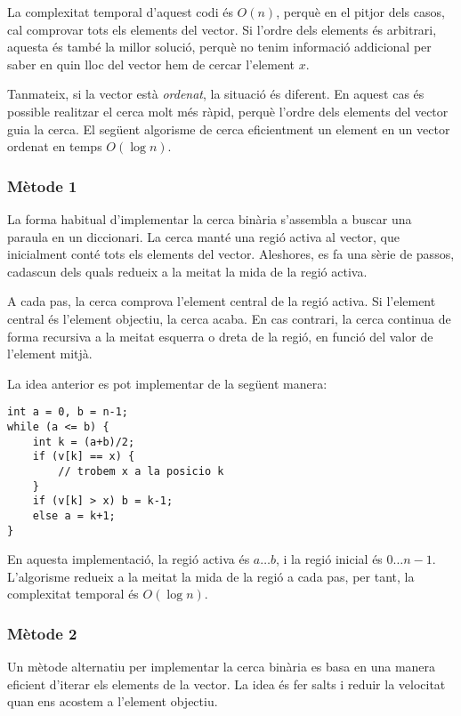 La complexitat temporal d'aquest codi és $O(n)$,
perquè en el pitjor dels casos, cal comprovar
tots els elements del vector.
Si l'ordre dels elements és arbitrari,
aquesta és també la millor solució, perquè
no tenim informació addicional per saber en quin
lloc del vector hem de cercar l'element $x$.

Tanmateix, si la vector està \emph{ordenat},
la situació és diferent.
En aquest cas és possible realitzar el
cerca molt més ràpid, perquè l'ordre dels
elements del vector guia la cerca.
El següent algorisme de 
cerca eficientment un element en un vector ordenat
en temps $O(\log n)$.

\subsubsection{Mètode 1}

La forma habitual d'implementar la cerca binària
s'assembla a buscar una paraula en un diccionari.
La cerca manté una regió activa al vector,
que inicialment conté tots els elements del vector.
Aleshores, es fa una sèrie de passos,
cadascun dels quals redueix a la meitat la mida de la regió
activa.

A cada pas, la cerca comprova l'element central
de la regió activa.
Si l'element central és l'element objectiu,
la cerca acaba.
En cas contrari, la cerca continua de forma recursiva
a la meitat esquerra o dreta de la regió,
en funció del valor de l'element mitjà.

La idea anterior es pot implementar de la següent manera:
\begin{lstlisting}
int a = 0, b = n-1;
while (a <= b) {
    int k = (a+b)/2;
    if (v[k] == x) {
        // trobem x a la posicio k
    }
    if (v[k] > x) b = k-1;
    else a = k+1;
}
\end{lstlisting}

En aquesta implementació, la regió activa és $a \ldots b$,
i la regió inicial és $0 \ldots n-1$.
L'algorisme redueix a la meitat la mida de la regió a cada pas,
per tant, la complexitat temporal és $O(\log n)$.

\subsubsection{Mètode 2}

Un mètode alternatiu per implementar la cerca binària
es basa en una manera eficient d'iterar
els elements de la vector.
La idea és fer salts i reduir la velocitat
quan ens acostem a l'element objectiu.


